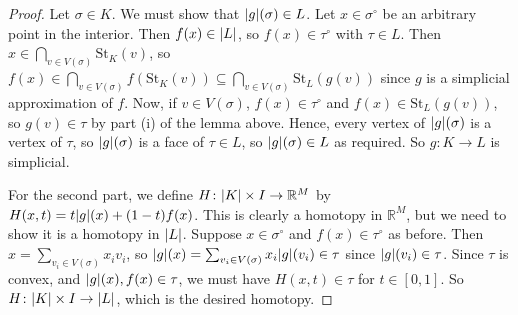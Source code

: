 \begin{proof}
	Let \( \sigma \in K \).
	We must show that \( \abs{g}(\sigma) \in L \).
	Let \( x \in \sigma^\circ \) be an arbitrary point in the interior.
	Then \( f(x) \in \abs{L} \), so \( f(x) \in \tau^\circ \) with \( \tau \in L \).
	Then \( x \in \bigcap_{v \in V(\sigma)} \mathrm{St}_K(v) \), so \( f(x) \in \bigcap_{v \in V(\sigma)} f(\mathrm{St}_K(v)) \subseteq \bigcap_{v \in V(\sigma)} \mathrm{St}_L(g(v)) \) since \( g \) is a simplicial approximation of \( f \).
	Now, if \( v \in V(\sigma) \), \( f(x) \in \tau^\circ \) and \( f(x) \in \mathrm{St}_L(g(v)) \), so \( g(v) \in \tau \) by part (i) of the lemma above.
	Hence, every vertex of \( \abs{g}(\sigma) \) is a vertex of \( \tau \), so \( \abs{g}(\sigma) \) is a face of \( \tau \in L \), so \( \abs{g}(\sigma) \in L \) as required.
	So \( g \colon K \to L \) is simplicial.

	For the second part, we define \( H \colon \abs{K} \times I \to \mathbb R^M \) by \( H(x,t) = t \abs{g}(x) + (1-t)f(x) \).
	This is clearly a homotopy in \( \mathbb R^M \), but we need to show it is a homotopy in \( \abs{L} \).
	Suppose \( x \in \sigma^\circ \) and \( f(x) \in \tau^\circ \) as before.
	Then \( x = \sum_{v_i \in V(\sigma)} x_i v_i \), so \( \abs{g}(x) = \sum_{v_i \in V(\sigma)} x_i \abs{g}(v_i) \in \tau \) since \( \abs{g}(v_i) \in \tau \).
	Since \( \tau \) is convex, and \( \abs{g}(x), f(x) \in \tau \), we must have \( H(x,t) \in \tau \) for \( t \in [0,1] \).
	So \( H \colon \abs{K} \times I \to \abs{L} \), which is the desired homotopy.
\end{proof}
